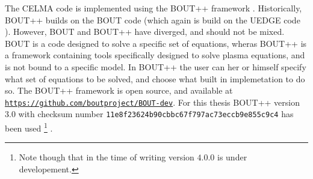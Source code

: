 \label{chap:BOUT++}
The CELMA code is implemented using the BOUT++ framework \cite{Dudson2009,Dudson2014a,Dudson2016}.
Historically, BOUT++ builds on the BOUT code \cite{Xu1998} (which again is build on the UEDGE code \cite{Rognlien1996}).
However, BOUT and BOUT++ have diverged, and should not be mixed.
BOUT is a code designed to solve a specific set of equations, wheras BOUT++ is a framework containing tools specifically designed to solve plasma equations, and is not bound to a specific model.
In BOUT++ the user can her or himself specify what set of equations to be solved, and choose what built in implemetation to do so.
The BOUT++ framework is open source, and available at \href{https://github.com/boutproject/BOUT-dev}{\texttt{https://github.com/boutproject/BOUT-dev}}.
For this thesis BOUT++ version $3.0$ with checksum number \texttt{11e8f23624b90cbbc67f797ac73eccb9e855c9c4} has been used%
%
\footnote{Note though that in the time of writing version $4.0.0$ is under developement.}%
%
.
